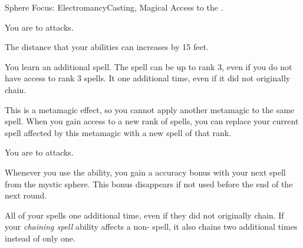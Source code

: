   \begin{magicalfeat}{Sphere Focus: Electromancy}{Casting, Magical}
    \featpre Access to the  .

     You are \impervious to \atElectricity attacks.

     The distance that your abilities can  increases by 15 feet.

     You learn an additional  spell.
    The spell can be up to rank 3, even if you do not have access to rank 3 spells.
    It  one additional time, even if it did not originally chain.

    This is a metamagic effect, so you cannot apply another metamagic to the same spell.
    When you gain access to a new rank of spells, you can replace your current spell affected by this metamagic with a new spell of that rank.

     You are  to \atElectricity attacks.

     Whenever you use the  ability, you gain a  accuracy bonus with your next spell from the  mystic sphere.
    This bonus disappears if not used before the end of the next round.

     All of your   spells  one additional time, even if they did not originally chain.
    If your \textit{chaining spell} ability affects a non- spell, it also chains two additional times instead of only one.
  \end{magicalfeat}

